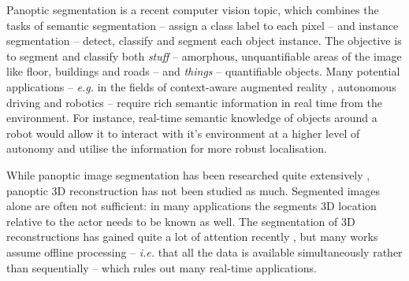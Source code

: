 
Panoptic segmentation \cite{panoptic_segmentation} is a recent computer vision topic, which combines the tasks of semantic segmentation -- assign a class label to each pixel -- and instance segmentation -- detect, classify and segment each object instance. The objective is to segment and classify both \textit{stuff} -- amorphous, unquantifiable areas of the image like floor, buildings and roads -- and \textit{things} -- quantifiable objects. Many potential applications -- \textit{e.g.} in the fields of context-aware augmented reality \cite{panopticfusion}, autonomous driving \cite{real_time_panoptic} and robotics \cite{interactive_3d_scenes} -- require rich semantic information in real time from the environment. For instance, real-time semantic knowledge of objects around a robot would allow it to interact with it's environment at a higher level of autonomy and utilise the information for more robust localisation.

While panoptic image segmentation has been researched quite extensively \cite{panopticfpn,seamless,panoptic_deeplab,efficientps,real_time_panoptic}, panoptic 3D reconstruction has not been studied as much. Segmented images alone are often not sufficient: in many applications the segments 3D location relative to the actor needs to be known as well. The segmentation of 3D reconstructions has gained quite a lot of attention recently \cite{scannet,s3dis,paris_lille_3d}, but many works assume offline processing -- \textit{i.e.} that all the data is available simultaneously rather than sequentially -- which rules out many real-time applications. 


